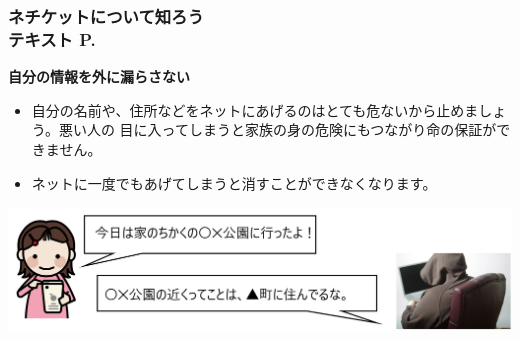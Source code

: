 \begin{frame}[fragile]
    \frametitle{ネチケットについて知ろう\\テキスト P.\pageref{1:P:Netiquette}~~~}
    \large\textbf{自分の情報を外に漏らさない}
            \begin{itemize}\small
                \item 自分の名前や、住所などをネットにあげるのはとても危ないから止めましょう。悪い人の
                目に入ってしまうと家族の身の危険にもつながり命の保証ができません。
                \item ネットに一度でもあげてしまうと消すことができなくなります。
            \end{itemize}
            \vfill
            
			\begin{minipage}{\textwidth}
                {\upshape
                  \includegraphics[width=\textwidth]{slide07-img/slide07-img007.png}}
            \end{minipage}
\end{frame}

